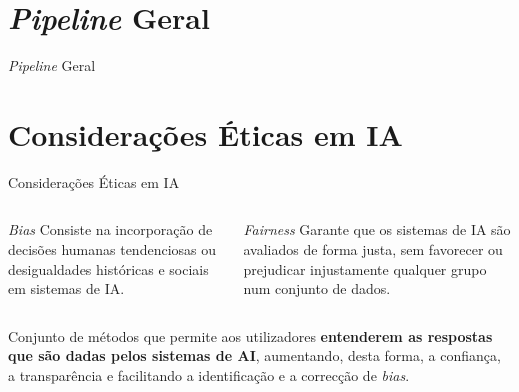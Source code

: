 \section{\textit{Pipeline} Geral}

\begin{frame}{\textit{Pipeline} Geral}
    
    \begin{figure}
        \centering
        \resizebox{\textwidth}{!}{
            
        }
    \end{figure}

\end{frame}

\section{Considerações Éticas em IA}


\begin{frame}{Considerações Éticas em IA}
    
    \begin{columns}
    \begin{column}{0.45\textwidth}
        \begin{alertblock}{\textit{Bias}}
            Consiste na incorporação de decisões humanas tendenciosas ou desigualdades históricas e sociais em sistemas de IA.
        \end{alertblock}
    \end{column}
    \pause
    \begin{column}{0.45\textwidth}
        \begin{alertblock}{\textit{Fairness}}
            Garante que os sistemas de IA são avaliados de forma justa, sem favorecer ou prejudicar injustamente qualquer grupo num conjunto de dados.
        \end{alertblock}
    \end{column}
\end{columns}

\pauseskip


Conjunto de métodos que permite aos utilizadores \textbf{entenderem as respostas que são dadas pelos sistemas de AI}, aumentando, desta forma, a confiança, a transparência e facilitando a identificação e a correcção de \textit{bias}.

\end{frame}
